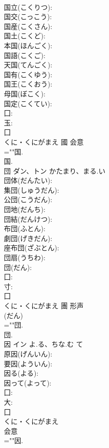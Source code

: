 \documentclass[8pt]{extreport}
\begin{document}
\begin{CJK}{UTF8}{min}
\\	国立(こくりつ): 
\\	国交(こっこう): 
\\	国産(こくさん): 
\\	国土(こくど): 
\\	本国(ほんごく): 
\\	国語(こくご): 
\\	天国(てんごく): 
\\	国有(こくゆう): 
\\	国王(こくおう): 
\\	母国(ぼこく): 
\\	国定(こくてい): 
\\	囗: 
\\	玉: 
\\	囗	
\\	くに・くにがまえ	國	会意 
\\	=""国.
\\	国.
\\	団	ダン、トン	かたまり、まる.い		
\\	団体(だんたい): 
\\	集団(しゅうだん): 
\\	公団(こうだん): 
\\	団地(だんち): 
\\	団結(だんけつ): 
\\	布団(ふとん): 
\\	劇団(げきだん): 
\\	座布団(ざぶとん): 
\\	団扇(うちわ): 
\\	団(だん): 
\\	囗: 
\\	寸: 
\\	囗	
\\	くに・くにがまえ	團	形声 
\\	(だん) 
\\	=""団.
\\	団.
\\	因	イン	よ.る、ちな.む	て	
\\	原因(げんいん): 
\\	要因(よういん): 
\\	因る(よる): 
\\	因って(よって): 
\\	囗: 
\\	大: 
\\	囗	
\\	くに・くにがまえ	
\\	会意 
\\	=""因.

\end{CJK}
\end{document}
